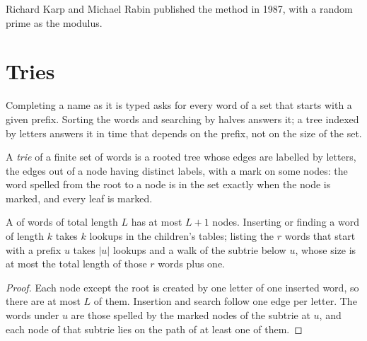 Richard Karp and Michael Rabin published the method in 1987, with a random prime as the modulus.

\section{Tries}\label{sec:b2:text-algorithms:tries}

Completing a name as it is typed asks for every word of a set that starts with a given prefix. Sorting the words and
searching by halves answers it; a tree indexed by letters answers it in time that depends on the prefix, not on the
size of the set.

\begin{definition}[Trie]\label{def:b2:text-algorithms:trie}
A \emph{trie} of a finite set of words is a rooted tree whose edges are labelled by letters, the edges out
of a node having distinct labels, with a mark on some nodes: the word spelled from the root to a node is in the set
exactly when the node is marked, and every leaf is marked.
\end{definition}

\label{lst:b2:text-algorithms:trie}

\begin{proposition}\label{prop:b2:text-algorithms:trie}
A  of words of total length $L$ has at most $L + 1$ nodes. Inserting or finding a word of length $k$ takes $k$
lookups in the children's tables; listing the $r$ words that start with a prefix $u$ takes $|u|$ lookups and a walk of
the subtrie below $u$, whose size is at most the total length of those $r$ words plus one.
\end{proposition}

\begin{proof}
Each node except the root is created by one letter of one inserted word, so there are at most $L$ of them. Insertion and
search follow one edge per letter. The words under $u$ are those spelled by the marked nodes of the subtrie at $u$, and
each node of that subtrie lies on the path of at least one of them.
\end{proof}

\label{out:b2:text-algorithms:trie}

